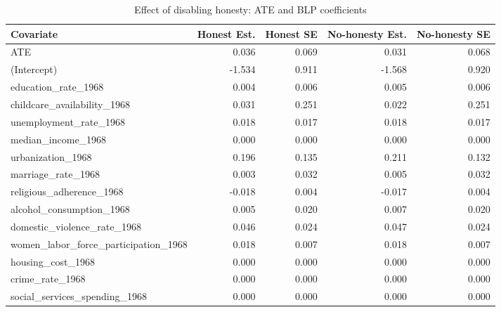 \begin{table}[!htbp]\centering
\caption{Effect of disabling honesty: ATE and BLP coefficients}
\label{tab:ex2d_honesty}
\begin{tabular}{lrrrr}
\toprule
Covariate & Honest Est. & Honest SE & No-honesty Est. & No-honesty SE \\
\midrule
ATE & 0.036 & 0.069 & 0.031 & 0.068 \\
(Intercept) & -1.534 & 0.911 & -1.568 & 0.920 \\
education\_rate\_1968 & 0.004 & 0.006 & 0.005 & 0.006 \\
childcare\_availability\_1968 & 0.031 & 0.251 & 0.022 & 0.251 \\
unemployment\_rate\_1968 & 0.018 & 0.017 & 0.018 & 0.017 \\
median\_income\_1968 & 0.000 & 0.000 & 0.000 & 0.000 \\
urbanization\_1968 & 0.196 & 0.135 & 0.211 & 0.132 \\
marriage\_rate\_1968 & 0.003 & 0.032 & 0.005 & 0.032 \\
religious\_adherence\_1968 & -0.018 & 0.004 & -0.017 & 0.004 \\
alcohol\_consumption\_1968 & 0.005 & 0.020 & 0.007 & 0.020 \\
domestic\_violence\_rate\_1968 & 0.046 & 0.024 & 0.047 & 0.024 \\
women\_labor\_force\_participation\_1968 & 0.018 & 0.007 & 0.018 & 0.007 \\
housing\_cost\_1968 & 0.000 & 0.000 & 0.000 & 0.000 \\
crime\_rate\_1968 & 0.000 & 0.000 & 0.000 & 0.000 \\
social\_services\_spending\_1968 & 0.000 & 0.000 & 0.000 & 0.000 \\
\bottomrule
\end{tabular}
\end{table}
